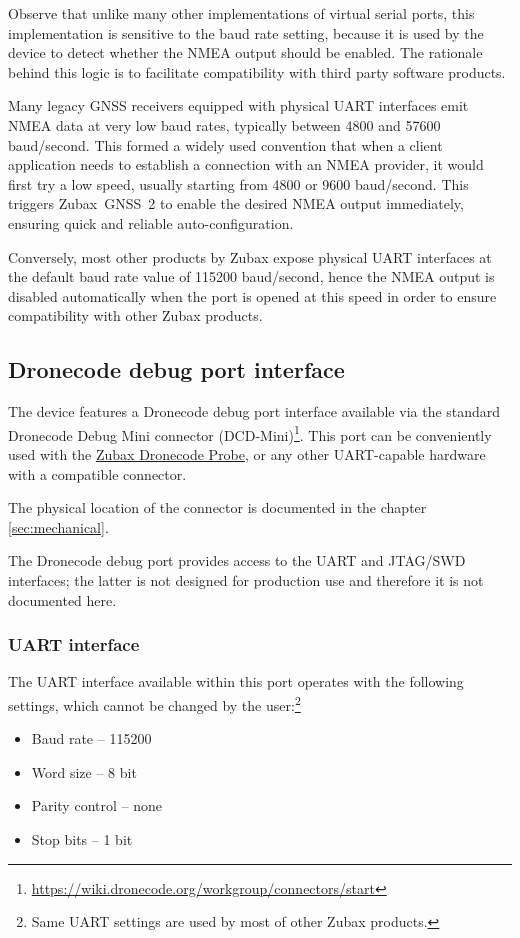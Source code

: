 \documentclass{zubaxdoc}
\begin{document}
Observe that unlike many other implementations of virtual serial ports,
this implementation is sensitive to the baud rate setting,
because it is used by the device to detect whether the NMEA output should be enabled.
The rationale behind this logic is to facilitate compatibility with third party software products.

Many legacy GNSS receivers equipped with physical UART interfaces emit NMEA data at very low
baud rates, typically between 4800 and 57600 baud/second.
This formed a widely used convention that when a client application needs to establish a connection
with an NMEA provider, it would first try a low speed, usually starting from 4800 or 9600
baud/second.
This triggers Zubax~GNSS~2 to enable the desired NMEA output immediately,
ensuring quick and reliable auto-configuration.

Conversely, most other products by Zubax expose physical UART interfaces at the default baud rate
value of 115200 baud/second, hence the NMEA output is disabled automatically when the port is opened at
this speed in order to ensure compatibility with other Zubax products.

\subsection{Dronecode debug port interface}

The device features a Dronecode debug port interface available via the standard
Dronecode Debug Mini connector (DCD-Mini)\footnote{\url{https://wiki.dronecode.org/workgroup/connectors/start}}.
This port can be conveniently used with the \href{https://kb.zubax.com/x/iIAh}{Zubax Dronecode Probe},
or any other UART-capable hardware with a compatible connector.

The physical location of the connector is documented in the chapter \ref{sec:mechanical}.

The Dronecode debug port provides access to the UART and JTAG/SWD interfaces;
the latter is not designed for production use and therefore it is not documented here.

\subsubsection{UART interface}

The UART interface available within this port operates with the following settings,
which cannot be changed by the user:\footnote{
Same UART settings are used by most of other Zubax products.}
\begin{itemize}
    \item Baud rate -- 115200
    \item Word size -- 8 bit
    \item Parity control -- none
    \item Stop bits -- 1 bit
\end{itemize}
\end{document}
